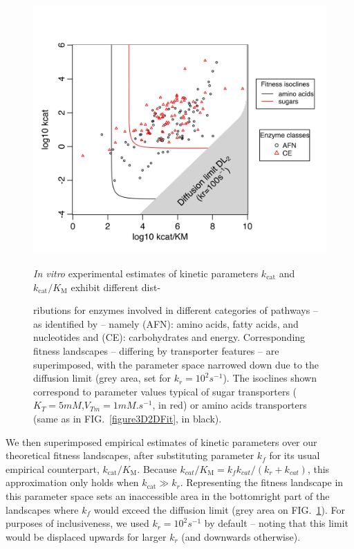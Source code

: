 \begin{figure}[h!]
\centering
\begin{minipage}[c]{0.5\textwidth}
\includegraphics[scale=0.65,trim=0cm 0cm 0cm 1cm,clip]{pics/Enzymes/2DFitContour_DataClasses.jpeg}
\vspace{-0.5cm}
\caption{\textit{In vitro} experimental estimates of kinetic parameters $k_\text{cat}$ and $k_\text{cat}/K_\text{M}$ exhibit different dist-}
\label{figure2D_BarEven_Dataset}
\end{minipage}\hfill
%
\begin{minipage}[c]{0.38\textwidth}
\caption*{ributions for enzymes involved in different categories of pathways -- as identified by \citet{Bar-Even11} -- namely (AFN): amino acids, fatty acids, and nucleotides and (CE): carbohydrates and energy. Corresponding fitness landscapes -- differing by transporter features -- are superimposed, with the parameter space narrowed down due to the diffusion limit (grey area, set for $k_r=10^2 s^{-1}$). The isoclines shown correspond to parameter values typical of sugar transporters ($K_T=5mM$,$V_{Tm}=1mM.s^{-1}$, in red) \citep{Maier02} or amino acids transporters (same as in FIG.~\ref{figure3D2DFit}, in black).}
\end{minipage}
\end{figure}

We then superimposed empirical estimates of kinetic parameters over our theoretical fitness landscapes, after substituting parameter $k_f$ for its usual empirical counterpart, $k_\text{cat} / K_\text{M}$. Because $k_{cat}/K_\text{M} = k_fk_{cat}/(k_r+k_{cat})$, this approximation only holds when $k_\text{cat} \gg k_r$. Representing the fitness landscape in this parameter space
sets an inaccessible area in the bottomright part of the landscapes where $k_f$ would exceed the diffusion limit (grey area on FIG.~\ref{figure2D_BarEven_Dataset}). For purposes of inclusiveness, we used $k_r=10^{2}s^{-1}$ by default -- noting that this limit would be displaced upwards for larger $k_r$ (and downwards otherwise).

